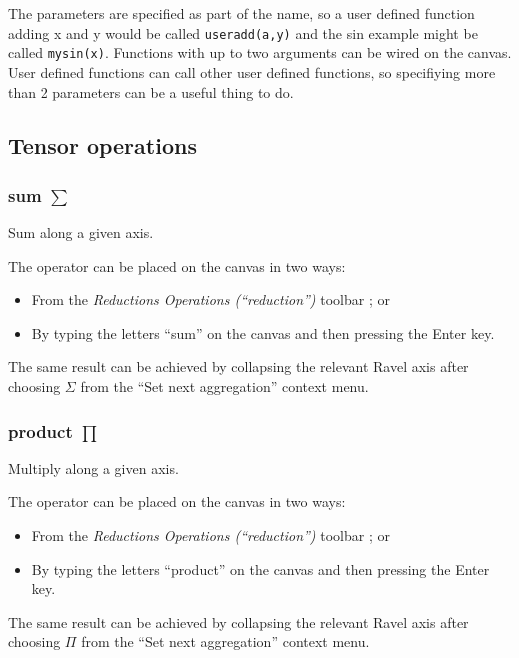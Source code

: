 The parameters are specified as part of the name, so a user defined
function adding x and y would be called \verb'useradd(a,y)' and the
sin example might be called \verb'mysin(x)'. Functions with up to two
arguments can be wired on the canvas. User defined functions can call
other user defined functions, so specifiying more than 2 parameters
can be a useful thing to do.

\subsection{Tensor operations}
\label{operations-reduction}\label{operations-scan}\label{operations-tensor}

\label{Operations: Reduction}

\subsubsection{sum $\sum$}


\label{Operation:sum} Sum along a given axis.

The operator can be placed on the canvas in two ways:
\begin{itemize}
\item From the \emph{Reductions Operations (``reduction'')} toolbar ;
or 
\item By typing the letters ``sum'' on the canvas and then pressing the
Enter key.
\end{itemize}
The same result can be achieved by collapsing the relevant Ravel axis
after choosing $\Sigma$ from the ``Set next
aggregation'' context menu.

\subsubsection{product $\prod$}


\label{Operation:product} Multiply along a given axis.

The operator can be placed on the canvas in two ways:
\begin{itemize}
\item From the \emph{Reductions Operations (``reduction'')} toolbar ;
or 
\item By typing the letters ``product'' on the canvas and then pressing
the Enter key.
\end{itemize}
The same result can be achieved by collapsing the relevant Ravel axis
after choosing $\Pi$ from the ``Set next
aggregation'' context menu.

